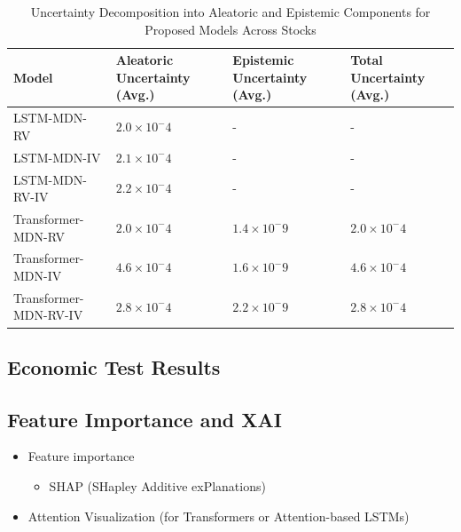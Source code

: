 \begin{table}[H]
    \centering
    \caption[Uncertainty Decomposition into Aleatoric and Epistemic Components for Proposed Models Across Stocks]{Uncertainty Decomposition into Aleatoric and Epistemic Components for Proposed Models Across Stocks}
    \label{table:uncertainty_decomposition_proposed_models}
    \begin{tabular}{
        p{}  %
        >{\centering\arraybackslash}p{}
        >{\centering\arraybackslash}p{}
        >{\centering\arraybackslash}p{}
    }
        \toprule
        \textbf{Model} & \textbf{Aleatoric Uncertainty (Avg.)} & \textbf{Epistemic Uncertainty (Avg.)} & \textbf{Total Uncertainty (Avg.)} \\
        \midrule
        LSTM-MDN-RV & $2.0 \times 10^-4$ & - & - \\
        LSTM-MDN-IV & $2.1 \times 10^-4$ & - & - \\
        LSTM-MDN-RV-IV & $2.2 \times 10^-4$ & - & - \\
        Transformer-MDN-RV & $2.0 \times 10^-4$ & $1.4 \times 10^-9$ & $2.0 \times 10^-4$ \\
        Transformer-MDN-IV & $4.6 \times 10^-4$ & $1.6 \times 10^-9$ & $4.6 \times 10^-4$ \\
        Transformer-MDN-RV-IV & $2.8 \times 10^-4$ & $2.2 \times 10^-9$ & $2.8 \times 10^-4$ \\
        \bottomrule
    \end{tabular}
\end{table}





\subsection{Economic Test Results}
\label{sec:economic_test_results}




\subsection{Feature Importance and XAI}
\label{sec:feature_importance_xai}
\begin{itemize}
    \item Feature importance
    \begin{itemize}
        \item SHAP (SHapley Additive exPlanations)
    \end{itemize}
    \item Attention Visualization (for Transformers or Attention-based LSTMs)
    
\end{itemize}
